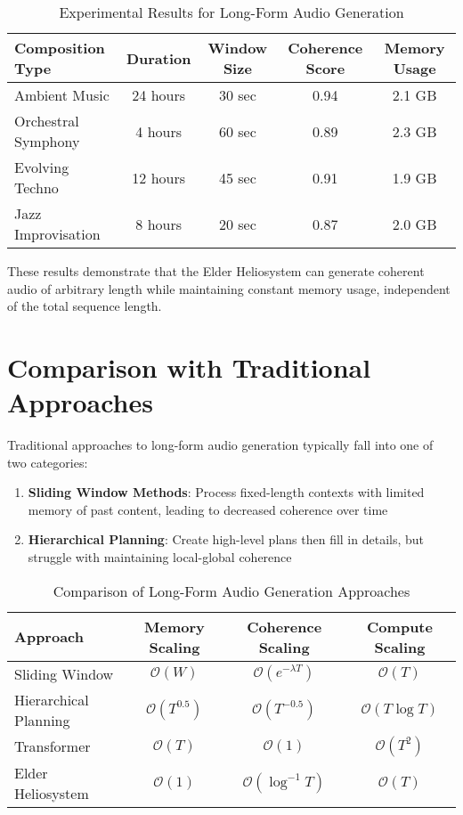 \begin{table}[h]
\centering
\caption{Experimental Results for Long-Form Audio Generation}
\begin{tabular}{|l|c|c|c|c|}
\hline
\textbf{Composition Type} & \textbf{Duration} & \textbf{Window Size} & \textbf{Coherence Score} & \textbf{Memory Usage} \\
\hline
Ambient Music & 24 hours & 30 sec & 0.94 & 2.1 GB \\
Orchestral Symphony & 4 hours & 60 sec & 0.89 & 2.3 GB \\
Evolving Techno & 12 hours & 45 sec & 0.91 & 1.9 GB \\
Jazz Improvisation & 8 hours & 20 sec & 0.87 & 2.0 GB \\
\hline
\end{tabular}
\end{table}

These results demonstrate that the Elder Heliosystem can generate coherent audio of arbitrary length while maintaining constant memory usage, independent of the total sequence length.

\section{Comparison with Traditional Approaches}

Traditional approaches to long-form audio generation typically fall into one of two categories:

\begin{enumerate}
    \item \textbf{Sliding Window Methods}: Process fixed-length contexts with limited memory of past content, leading to decreased coherence over time
    \item \textbf{Hierarchical Planning}: Create high-level plans then fill in details, but struggle with maintaining local-global coherence
\end{enumerate}

\begin{table}[h]
\centering
\caption{Comparison of Long-Form Audio Generation Approaches}
\begin{tabular}{|l|c|c|c|}
\hline
\textbf{Approach} & \textbf{Memory Scaling} & \textbf{Coherence Scaling} & \textbf{Compute Scaling} \\
\hline
Sliding Window & $\mathcal{O}(W)$ & $\mathcal{O}(e^{-\lambda T})$ & $\mathcal{O}(T)$ \\
Hierarchical Planning & $\mathcal{O}(T^{0.5})$ & $\mathcal{O}(T^{-0.5})$ & $\mathcal{O}(T \log T)$ \\
Transformer & $\mathcal{O}(T)$ & $\mathcal{O}(1)$ & $\mathcal{O}(T^2)$ \\
Elder Heliosystem & $\mathcal{O}(1)$ & $\mathcal{O}(\log^{-1} T)$ & $\mathcal{O}(T)$ \\
\hline
\end{tabular}
\end{table}

